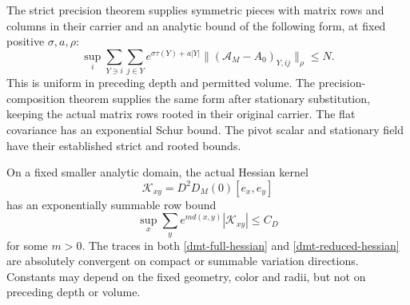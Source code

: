 The strict precision theorem supplies symmetric pieces with
matrix rows and columns in their carrier and an analytic bound
of the following form, at fixed positive
\(\sigma,a,\rho\):
\begin{equation}
 \sup_i\sum_{Y\ni i}\sum_{j\in Y}
 e^{\sigma\tau(Y)+a|Y|}
 \|(\mathscr A_M-A_0)_{Y,ij}\|_\rho\le N.
 \label{dmt-strict-row-input}
\end{equation}
This is uniform in preceding depth and permitted volume.
The precision-composition theorem supplies the same form
after stationary substitution, keeping the actual matrix
rows rooted in their original carrier. The flat covariance
has an exponential Schur bound. The pivot scalar and
stationary field have their established strict and rooted
bounds.

\begin{lemma}
\label{dmt-trace-convergence}
On a fixed smaller analytic domain, the actual Hessian
kernel
\[
 \mathcal K_{xy}=D^2D_M(0)[e_x,e_y]
\]
has an exponentially summable row bound
\begin{equation}
       \sup_x\sum_y e^{m d(x,y)}|\mathcal K_{xy}|
                       \le C_D
 \label{dmt-kernel-decay}
\end{equation}
for some \(m>0\). The traces in both
\eqref{dmt-full-hessian} and
\eqref{dmt-reduced-hessian} are absolutely convergent on
compact or summable variation directions. Constants may
depend on the fixed geometry, color and radii, but not
on preceding depth or volume.
\end{lemma}
